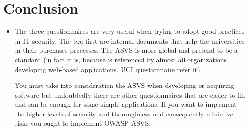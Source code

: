 \documentclass[paper=letter, fontsize=12pt]{article}
\begin{document}
\section{Conclusion}
 \begin{itemize}
 \item The three questionnaires are very useful when trying to adopt good practices in IT security. The two first are internal documents that help the universities in their purchases processes. The ASVS is more global and pretend to be a standard (in fact it is, because is referenced by almost all organizations developing web-based applications. UCI questionnaire refer it). \newline \newline 
 
You must take into consideration the ASVS when developing or acquiring software but undoubtedly there are other questionnaires that are easier to fill and can be enough for some simple applications. If you want to implement the higher levels of security and thoroughness and consequently minimize risks you ought to implement OWASP ASVS.  
 
 \end{itemize}

\\ \\
\end{document}
